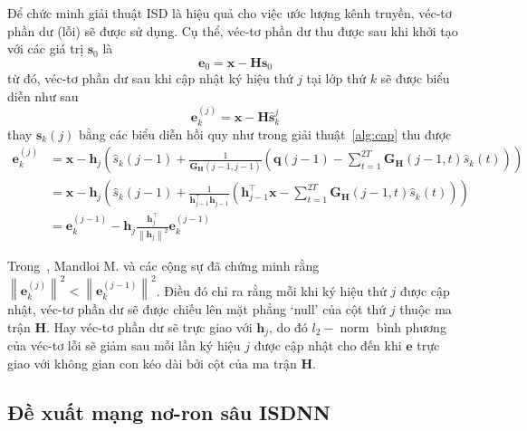 Để chức minh giải thuật ISD là hiệu quả cho việc ước lượng kênh truyền, véc-tơ phần dư (lỗi) sẽ được sử dụng. Cụ thể, véc-tơ phần dư thu được sau khi khởi tạo với các giá trị $\mathbf{s}_0$ là
\begin{equation}
    \mathbf{e}_0 = \mathbf{x} - \mathbf{H} \mathbf{s}_0
\end{equation}
từ đó, véc-tơ phần dư sau khi cập nhật ký hiệu thứ $j$ tại lớp thứ $k$ sẽ được biểu diễn như sau
\begin{equation}
    \mathbf{e}_k^{(j)}=\mathbf{x}-\mathbf{H} \hat{\mathbf{s}}_k^j
\end{equation}
thay $\mathbf{s}_k(j)$ bằng các biểu diễn hồi quy như trong giải thuật~\ref{alg:cap} thu được
\begin{equation}
\label{eq:eupdate}
\begin{aligned}
    \mathbf{e}_k^{(j)} & =\mathbf{x}-\mathbf{h}_j\left(\hat{s}_k(j-1)+\frac{1}{\mathbf{G}_\mathbf{H}(j-1, j-1)}\left(\mathbf{q}(j-1)-\sum_{t=1}^{2T} \mathbf{G}_\mathbf{H}(j-1, t) \hat{s}_k(t)\right)\right) \\
    & =\mathbf{x}-\mathbf{h}_j\left(\hat{s}_k(j-1)+\frac{1}{\mathbf{h}^\top_{j-1} \mathbf{h}_{j-1}}\left(\mathbf{h}_{j-1}^\top \mathbf{x}-\sum_{t=1}^{2T} \mathbf{G}_\mathbf{H}(j-1, t) \hat{s}_k(t)\right)\right) \\
    & =\mathbf{e}_k^{(j-1)}-\mathbf{h}_{j} \frac{\mathbf{h}_j^\top}{\left\|\mathbf{h}_j\right\|^2} \mathbf{e}_k^{(j-1)}
    \end{aligned}
\end{equation}

Trong~\cite{Mandloi2017}, Mandloi M. và các cộng sự đã chứng minh rằng $\left\|\mathbf{e}_k^{(j)}\right\|^2<\left\|\mathbf{e}_k^{(j-1)}\right\|^2$. Điều đó chỉ ra rằng mỗi khi ký hiệu thứ $j$ được cập nhật, véc-tơ phần dư sẽ được chiếu lên mặt phẳng `null' của cột thứ $j$ thuộc ma trận $\mathbf{H}$. Hay véc-tơ phần dư sẽ trực giao với $\mathbf{h}_j$, do đó $l_2-\operatorname{norm}$ bình phương của véc-tơ lỗi sẽ giảm sau mỗi lần ký hiệu $j$ được cập nhật cho đến khi $\mathbf{e}$ trực giao với không gian con kéo dài bởi cột của ma trận $\mathbf{H}$.

\subsection{Đề xuất mạng nơ-ron sâu ISDNN}

